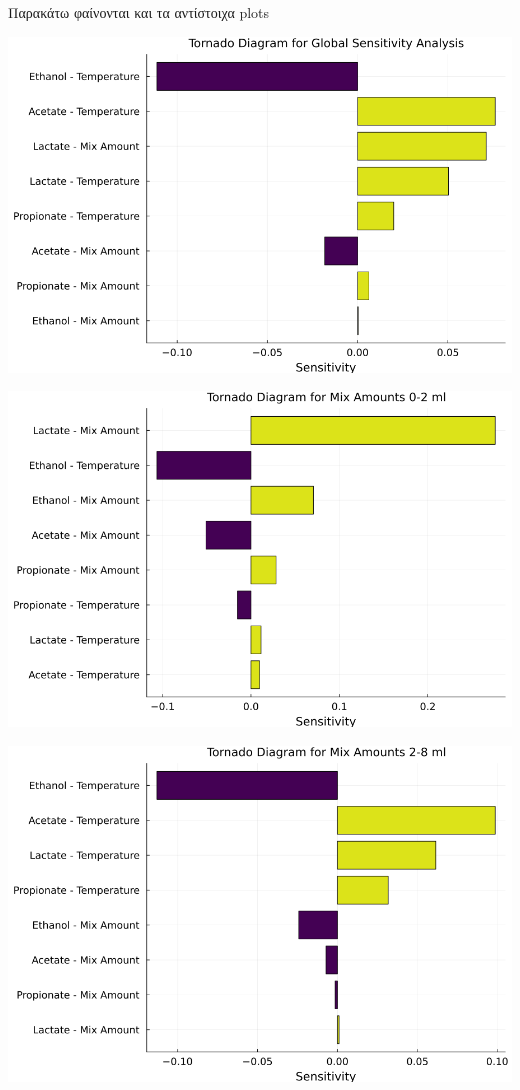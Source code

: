 \documentclass[11pt]{article}
\begin{document}
Παρακάτω φαίνονται και τα αντίστοιχα plots

\begin{center}
\includegraphics[width=.9\linewidth]{../plots/sensitivity/global_tornado.png}
\end{center}

\begin{center}
\includegraphics[width=.9\linewidth]{../plots/sensitivity/tornado_low.png}
\end{center}

\begin{center}
\includegraphics[width=.9\linewidth]{../plots/sensitivity/tornado_high.png}
\end{center}
\end{document}
